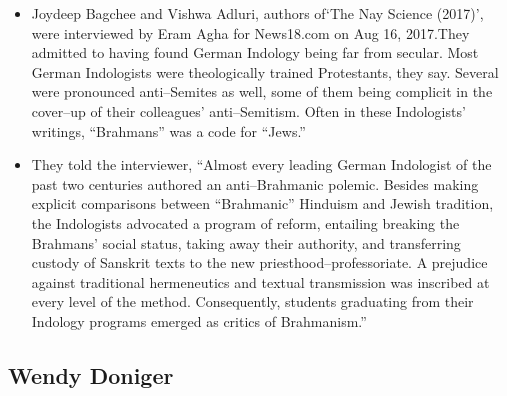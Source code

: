 \begin{itemize}
\item Joydeep Bagchee and Vishwa Adluri, authors of‘The Nay Science (2017)’, were interviewed by Eram Agha for News18.com on Aug 16, 2017.They admitted to having found German Indology being far from secular. Most German Indologists were theologically trained Protestants, they say. Several were pronounced anti–Semites as well, some of them being complicit in the cover–up of their colleagues’ anti–Semitism. Often in these Indologists’ writings, “Brahmans” was a code for “Jews.”

 \item They told the interviewer, “Almost every leading German Indologist of the past two centuries authored an anti–Brahmanic polemic. Besides making explicit comparisons between “Brahmanic” Hinduism and Jewish tradition, the Indologists advocated a program of reform, entailing breaking the Brahmans’ social status, taking away their authority, and transferring custody of Sanskrit texts to the new priesthood–professoriate. A prejudice against traditional hermeneutics and textual transmission was inscribed at every level of the method. Consequently, students graduating from their Indology programs emerged as critics of Brahmanism.”

\end{itemize}


\subsection*{Wendy Doniger}

